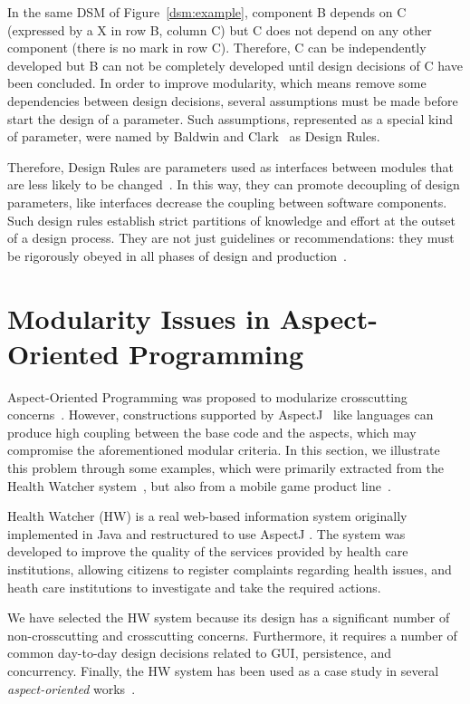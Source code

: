 In the same DSM of Figure~\ref{dsm:example}, component B depends on C (expressed
by a X in row B, column C) but C does not depend on any other component (there is
no mark in row C). Therefore, C can be independently developed but B can not be
completely developed until design decisions of C have been concluded. In order to
improve modularity, which means remove some dependencies between design
decisions, several assumptions must be made before start the design of a
parameter. Such assumptions, represented as a special kind of parameter,
were named by Baldwin and Clark~\cite{clark-design-rules-book} as Design Rules.

Therefore, Design Rules are parameters used as interfaces between modules that
are less likely to be changed~\cite{lopes-taosd-2006}. In this way, they can promote decoupling
of design parameters, like interfaces decrease the coupling between software
components. Such design rules establish strict partitions of knowledge and effort at the
outset of a design process. They are not just guidelines or recommendations: they must
be rigorously obeyed in all phases of design and production~\cite{clark-design-rules-book}.

\section{Modularity Issues in Aspect-Oriented Programming}\label{sec:aop-issues}

Aspect-Oriented Programming was proposed to modularize crosscutting
concerns~\cite{kiczales-ecoop-1997}. However, constructions supported by
AspectJ~\cite{kiczales-cacm-2001} like languages can produce high
coupling between the base code and the aspects, which may compromise
the aforementioned modular criteria. In this section, we illustrate
this problem through some examples, which were primarily extracted from 
the Health Watcher system~\cite{soares-oopsla-02}, but also from a mobile 
game product line~\cite{a}.

Health Watcher (HW) is a real web-based information system
originally implemented in Java and restructured to use AspectJ
\cite{kiczales-cacm-2001}. The system was developed to improve the quality
of the services provided by health care institutions, allowing citizens
to register complaints regarding health issues, and heath care
institutions to investigate and take the required actions. 

We have selected the HW system because its design has a significant number of
non-crosscutting and crosscutting concerns. Furthermore, it requires a number of
common day-to-day design decisions related to GUI, persistence, and concurrency.
Finally, the HW system has been used as a case study in several
\emph{aspect-oriented} works~\cite{greenwood-ecoop-2007, greenwood-ea-2007,
soares-oopsla-02}.

